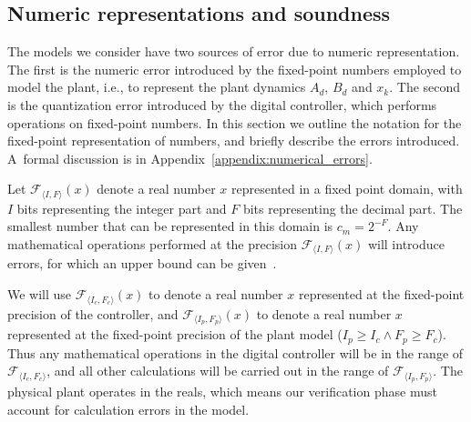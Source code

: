 \documentclass[runningheads,a4paper]{llncs}
\newcommand{\addtodo}[1]{{\color{red} TODO: #1}}
\begin{document}

\subsection{Numeric representations and soundness} 
\label{sec:numeric_rep}


The models we consider have two sources of error due to numeric
representation.  The first is the numeric error introduced by the
fixed-point numbers employed to model the plant, i.e., to represent the
plant dynamics $A_d$, $B_d$ and $x_k$.  The second is the quantization error
introduced by the digital controller, which performs operations on
fixed-point numbers.  In this section we outline the notation for the
fixed-point representation of numbers, and briefly describe the errors
introduced.  A~formal discussion is in
Appendix~\ref{appendix:numerical_errors}.

Let $\mathcal{F}_{\langle I,F \rangle}(x)$ denote a real number $x$
represented in a fixed point domain, with $I$ bits representing the integer
part and $F$ bits representing the decimal part.  The smallest number that
can be represented in this domain is $c_m=2^{-F}$.  Any mathematical
operations performed at the precision $\mathcal{F}_{\langle I,F \rangle}(x)$
will introduce errors, for which an upper bound can be
given~\cite{DBLP:conf/arith/BrainTRW15}.

We will use $\mathcal{F}_{\langle I_c,F_c \rangle}(x)$ to denote a real
number $x$ represented at the fixed-point precision of the controller, and
$\mathcal{F}_{\langle I_p,F_p \rangle}(x)$ to denote a real number $x$
represented at the fixed-point precision of the plant model ($I_p \geq I_c
\wedge\allowbreak F_p \geq F_c$).  Thus any mathematical operations in the
digital controller will be in the range of $\mathcal{F}_{\langle I_c,F_c
\rangle}$, and all other calculations will be carried out in the range of
$\mathcal{F}_{\langle I_p,F_p \rangle}$.  The physical plant operates in the
reals, which means our verification phase must account for calculation
errors in the model.
\end{document}

